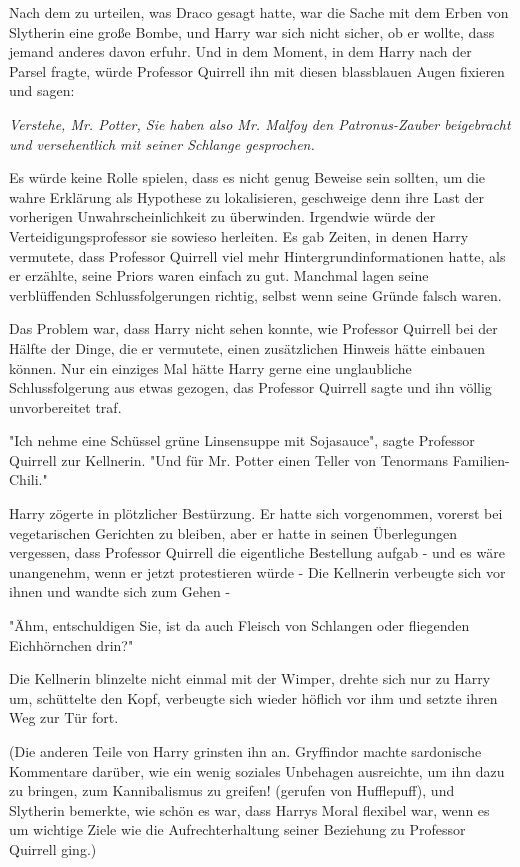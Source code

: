 {Nach dem zu urteilen, was Draco gesagt hatte, war die Sache mit dem Erben von Slytherin eine große Bombe, und Harry war sich nicht sicher, ob er wollte, dass jemand anderes davon erfuhr. Und in dem Moment, in dem Harry nach der Parsel fragte, würde Professor Quirrell ihn mit diesen blassblauen Augen fixieren und sagen:

\emph{Verstehe, Mr. Potter, Sie haben also Mr. Malfoy den Patronus-Zauber beigebracht und versehentlich mit seiner Schlange gesprochen.}

Es würde keine Rolle spielen, dass es nicht genug Beweise sein sollten, um die wahre Erklärung als Hypothese zu lokalisieren, geschweige denn ihre Last der vorherigen Unwahrscheinlichkeit zu überwinden. Irgendwie würde der Verteidigungsprofessor sie sowieso herleiten. Es gab Zeiten, in denen Harry vermutete, dass Professor Quirrell viel mehr Hintergrundinformationen hatte, als er erzählte, seine Priors waren einfach zu gut. Manchmal lagen seine verblüffenden Schlussfolgerungen richtig, selbst wenn seine Gründe falsch waren.

Das Problem war, dass Harry nicht sehen konnte, wie Professor Quirrell bei der Hälfte der Dinge, die er vermutete, einen zusätzlichen Hinweis hätte einbauen können. Nur ein einziges Mal hätte Harry gerne eine unglaubliche Schlussfolgerung aus etwas gezogen, das Professor Quirrell sagte und ihn völlig unvorbereitet traf.

"Ich nehme eine Schüssel grüne Linsensuppe mit Sojasauce", sagte Professor Quirrell zur Kellnerin. "Und für Mr. Potter einen Teller von Tenormans Familien-Chili."

Harry zögerte in plötzlicher Bestürzung. Er hatte sich vorgenommen, vorerst bei vegetarischen Gerichten zu bleiben, aber er hatte in seinen Überlegungen vergessen, dass Professor Quirrell die eigentliche Bestellung aufgab - und es wäre unangenehm, wenn er jetzt protestieren würde - Die Kellnerin verbeugte sich vor ihnen und wandte sich zum Gehen -

"Ähm, entschuldigen Sie, ist da auch Fleisch von Schlangen oder fliegenden Eichhörnchen drin?"

Die Kellnerin blinzelte nicht einmal mit der Wimper, drehte sich nur zu Harry um, schüttelte den Kopf, verbeugte sich wieder höflich vor ihm und setzte ihren Weg zur Tür fort.

(Die anderen Teile von Harry grinsten ihn an. Gryffindor machte sardonische Kommentare darüber, wie ein wenig soziales Unbehagen ausreichte, um ihn dazu zu bringen, zum Kannibalismus zu greifen! (gerufen von Hufflepuff), und Slytherin bemerkte, wie schön es war, dass Harrys Moral flexibel war, wenn es um wichtige Ziele wie die Aufrechterhaltung seiner Beziehung zu Professor Quirrell ging.)

}
